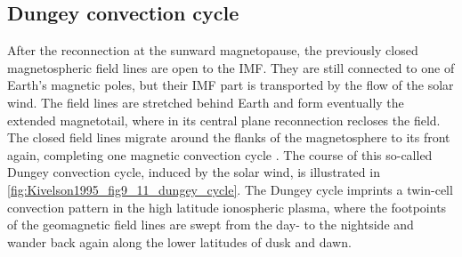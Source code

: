 \subsection{Dungey convection cycle}
\label{sec:dungey_convection_cycle}
After the reconnection at the sunward magnetopause, the previously closed magnetospheric field lines are open to the IMF. They are still connected to one of Earth's magnetic poles, but their IMF part is transported by the flow of the solar wind. The field lines are stretched behind Earth and form eventually the extended magnetotail, where in its central plane reconnection recloses the field. The closed field lines migrate around the flanks of the magnetosphere to its front again, completing one magnetic convection cycle \citep{Dungey1961,Dungey1963}. The course of this so-called Dungey convection cycle, induced by the solar wind, is illustrated in \autoref{fig:Kivelson1995_fig9_11_dungey_cycle}. The Dungey cycle imprints a twin-cell convection pattern in the high latitude ionospheric plasma, where the footpoints of the geomagnetic field lines are swept from the day- to the nightside and wander back again along the lower latitudes of dusk and dawn.
\begin{figure}[htb]
\end{figure}

